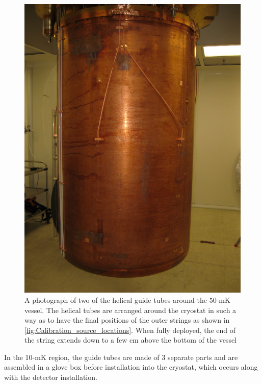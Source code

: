 \begin{figure}[htbp]
    \centering
    \includegraphics[height = 3.5 in]{Figures/HelicalTubes.jpg}
    \caption[A photograph of two of the helical guide tubes around the 50-mK vessel.]
    {A photograph of two of the helical guide tubes around the 50-mK vessel.
    The helical tubes are arranged around the cryostat in such a way as to have the final positions of the outer strings as shown in \autoref{fig:Calibration_source_locations}.
    When fully deployed, the end of the string extends down to a few cm above the bottom of the vessel}
    \label{fig:helical_tubes}
\end{figure}



In the 10-mK region, the guide tubes are made of 3 separate parts and are assembled in a glove box before installation into the cryostat, which occurs along with the detector installation.

